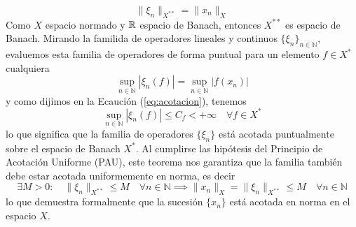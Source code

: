 \begin{ejercicio}
    $$ \|\xi_n\|_{X^{**}} = \|x_n\|_X$$
    Como $X$ espacio normado y $\mathbb{R}$ espacio de Banach, entonces $X^{**}$ es espacio de Banach. Mirando la familida de operadores lineales y continuos $\{\xi_n\}_{n \in \mathbb{N}}$, evaluemos esta familia de operadores de forma puntual para un elemento $f \in X^*$ cualquiera
    $$ \sup_{n \in \mathbb{N}} |\xi_n(f)| = \sup_{n \in \mathbb{N}} |f(x_n)| $$
    y como dijimos en la Ecaución (\ref{eq:acotacion}), tenemos
    $$ \sup_{n \in \mathbb{N}} |\xi_n(f)| \le C_f < +\infty \quad \forall f \in X^* $$
    lo que significa que la familia de operadores $\{\xi_n\}$ está acotada puntualmente sobre el espacio de Banach $X^*$. Al cumplirse las hipótesis del Principio de Acotación Uniforme (PAU), este teorema nos garantiza que la familia también debe estar acotada uniformemente en norma, es decir
    \begin{equation*}
        \exists M>0 : \quad \|\xi_n\|_{X^{**}} \le M \quad \forall n \in \mathbb{N}\implies \|x_n\|_X= \|\xi_n\|_{X^{**}}  \le M \quad \forall n \in \mathbb{N}
    \end{equation*}
    lo que demuestra formalmente que la sucesión $\{x_n\}$ está acotada en norma en el espacio $X$.
\end{ejercicio}

